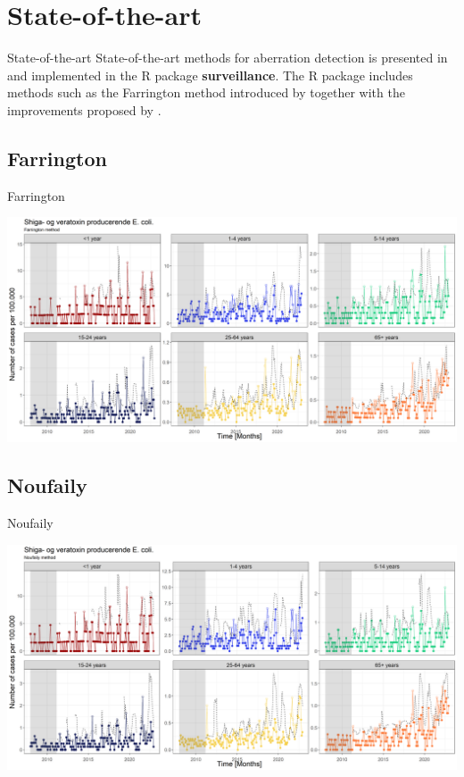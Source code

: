 \documentclass[aspectratio=169]{beamer}
\begin{document}
\hypertarget{state-of-the-art}{%
\section{State-of-the-art}\label{state-of-the-art}}

\begin{frame}{State-of-the-art}
State-of-the-art methods for aberration detection is presented in
\cite{Salmon_2016} and implemented in the R package
\textbf{surveillance}. The R package includes methods such as the
Farrington method introduced by \cite{Farrington_1996} together with the
improvements proposed by \cite{Noufaily_2013}.
\end{frame}

\hypertarget{farrington}{%
\subsection{Farrington}\label{farrington}}

\begin{frame}{Farrington}
\tiny

\includegraphics[width=1\linewidth]{../figures/STEC_farrington}

\normalsize
\end{frame}

\hypertarget{noufaily}{%
\subsection{Noufaily}\label{noufaily}}

\begin{frame}{Noufaily}
\tiny

\includegraphics[width=1\linewidth]{../figures/STEC_noufaily}

\normalsize
\end{frame}
\end{document}
